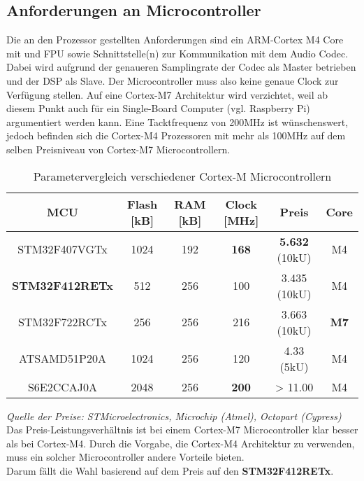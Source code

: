 \subsection{Anforderungen an Microcontroller}
\label{subsec:Konzept_Microcontroller}

Die an den Prozessor gestellten Anforderungen sind ein ARM-Cortex M4 Core mit und FPU sowie Schnittstelle(n) zur Kommunikation mit dem Audio Codec. 
Dabei wird aufgrund der genaueren Samplingrate der Codec als Master betrieben und der DSP als Slave.
Der Microcontroller muss also keine genaue Clock zur Verfügung stellen. 
Auf eine Cortex-M7 Architektur wird verzichtet, weil ab diesem Punkt auch für ein Single-Board Computer (vgl. Raspberry Pi) argumentiert werden kann.
Eine Tacktfrequenz von 200MHz ist wünschenswert, jedoch befinden sich die Cortex-M4 Prozessoren mit mehr als 100MHz auf dem selben Preisniveau von Cortex-M7 Microcontrollern.

\begin{table}[H]
	\centering
	\begin{tabular}{|c|c|c|c|c|c|}
		\hline
		\textbf{MCU}  & \textbf{Flash {[}kB{]}} & \textbf{RAM {[}kB{]}} & \textbf{Clock {[}MHz{]}} & \textbf{Preis} & \textbf{Core} \\ \hline
		STM32F407VGTx & 1024                    & 192                   & \textbf{168}             & \textbf{5.632} (10kU) & M4            \\ \hline
		\textbf{STM32F412RETx} & 512            & 256                   & 100                      & 3.435 (10kU)        & M4            \\ \hline
		STM32F722RCTx & 256                     & 256                   & 216                      & 3.663 (10kU)        & \textbf{M7}   \\ \hline
		ATSAMD51P20A  & 1024                    & 256                   & 120                      & 4.33 (5kU)          & M4            \\
		\hline
		S6E2CCAJ0A    & 2048                    & 256                   & \textbf{200}             & > 11.00             & M4            \\
		\hline
	\end{tabular}
 	\caption{Parametervergleich verschiedener Cortex-M Microcontrollern}
 	\label{tab:ComparisonMCU}
\end{table}

\textit{Quelle der Preise: STMicroelectronics, Microchip (Atmel), Octopart (Cypress)} \\

Das Preis-Leistungsverhältnis ist bei einem Cortex-M7 Microcontroller klar besser als bei Cortex-M4. Durch die Vorgabe, die Cortex-M4 Architektur zu verwenden, muss ein solcher Microcontroller andere Vorteile bieten.\\
Darum fällt die Wahl basierend auf dem Preis auf den \textbf{STM32F412RETx}.


